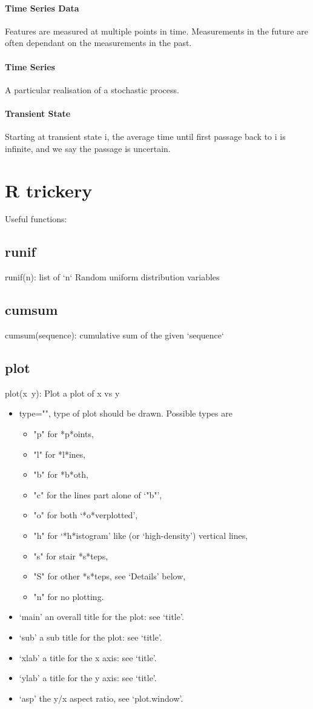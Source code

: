 \documentclass[12pt]{article}
\begin{document}
    \paragraph{Time Series Data} Features are measured at multiple points in time. Measurements in the future are often dependant on the measurements in the past.
    \paragraph{Time Series} A particular realisation of a stochastic process.
    \paragraph{Transient State} Starting at transient state i, the average time until first passage back to i is infinite, and we say the passage is uncertain.
\section{R trickery}
Useful functions:
\subsection{runif}
runif(n): list of `n` Random uniform distribution variables
\subsection{cumsum} cumsum(sequence): cumulative sum of the given `sequence`
\subsection{plot} plot(x~y): Plot a plot of x vs y
\begin{itemize}
	\item type="", type of plot should be drawn.  Possible types are
		\begin{itemize}
			\item "p" for *p*oints,
			\item "l" for *l*ines,
			\item "b" for *b*oth,
			\item "c" for the lines part alone of ‘"b"’,
			\item "o" for both ‘*o*verplotted’,
			\item "h" for ‘*h*istogram’ like (or ‘high-density’) vertical lines,
			\item "s" for stair *s*teps,
			\item "S" for other *s*teps, see ‘Details’ below,
			\item "n" for no plotting.
		\end{itemize}
	\item ‘main’ an overall title for the plot: see ‘title’.
	\item ‘sub’ a sub title for the plot: see ‘title’.
	\item ‘xlab’ a title for the x axis: see ‘title’.
	\item ‘ylab’ a title for the y axis: see ‘title’.
	\item ‘asp’ the y/x aspect ratio, see ‘plot.window’.
\end{itemize}
\end{document}
